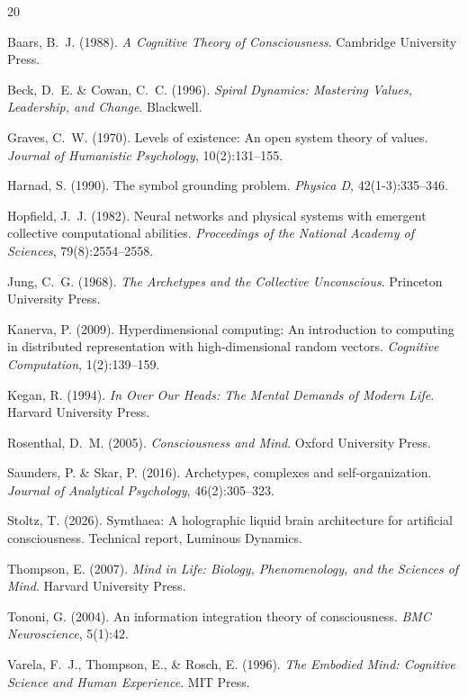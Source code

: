 \documentclass[11pt,a4paper]{article}
\begin{document}

\begin{thebibliography}{20}

Baars, B.~J. (1988).
\newblock \emph{A Cognitive Theory of Consciousness}.
\newblock Cambridge University Press.

Beck, D.~E. \& Cowan, C.~C. (1996).
\newblock \emph{Spiral Dynamics: Mastering Values, Leadership, and Change}.
\newblock Blackwell.

Graves, C.~W. (1970).
\newblock Levels of existence: An open system theory of values.
\newblock \emph{Journal of Humanistic Psychology}, 10(2):131--155.

Harnad, S. (1990).
\newblock The symbol grounding problem.
\newblock \emph{Physica D}, 42(1-3):335--346.

Hopfield, J.~J. (1982).
\newblock Neural networks and physical systems with emergent collective computational abilities.
\newblock \emph{Proceedings of the National Academy of Sciences}, 79(8):2554--2558.

Jung, C.~G. (1968).
\newblock \emph{The Archetypes and the Collective Unconscious}.
\newblock Princeton University Press.

Kanerva, P. (2009).
\newblock Hyperdimensional computing: An introduction to computing in distributed representation with high-dimensional random vectors.
\newblock \emph{Cognitive Computation}, 1(2):139--159.

Kegan, R. (1994).
\newblock \emph{In Over Our Heads: The Mental Demands of Modern Life}.
\newblock Harvard University Press.

Rosenthal, D.~M. (2005).
\newblock \emph{Consciousness and Mind}.
\newblock Oxford University Press.

Saunders, P. \& Skar, P. (2016).
\newblock Archetypes, complexes and self-organization.
\newblock \emph{Journal of Analytical Psychology}, 46(2):305--323.

Stoltz, T. (2026).
\newblock Symthaea: A holographic liquid brain architecture for artificial consciousness.
\newblock Technical report, Luminous Dynamics.

Thompson, E. (2007).
\newblock \emph{Mind in Life: Biology, Phenomenology, and the Sciences of Mind}.
\newblock Harvard University Press.

Tononi, G. (2004).
\newblock An information integration theory of consciousness.
\newblock \emph{BMC Neuroscience}, 5(1):42.

Varela, F.~J., Thompson, E., \& Rosch, E. (1996).
\newblock \emph{The Embodied Mind: Cognitive Science and Human Experience}.
\newblock MIT Press.

\end{thebibliography}
\end{document}
